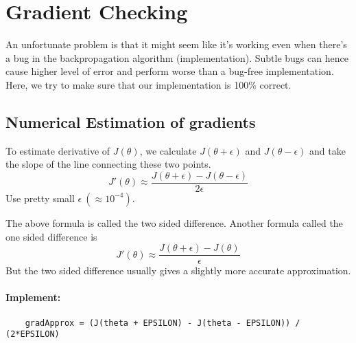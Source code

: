 \section{Gradient Checking}
An unfortunate problem is that it might seem like it's working even when there's a
bug in the backpropagation algorithm (implementation). Subtle bugs can hence cause
higher level of error and perform worse than a bug-free implementation. Here, we
try to make sure that our implementation is 100\% correct.

\subsection{Numerical Estimation of gradients}
To estimate derivative of $J(\theta)$, we calculate $J(\theta + \epsilon)$
and $J(\theta - \epsilon)$ and take the slope of the line connecting these two points.
\begin{equation*}
	J'(\theta) \approx \frac{J(\theta + \epsilon) - J(\theta - \epsilon)}{2\epsilon}
\end{equation*}
Use pretty small $\epsilon\ (\approx 10^{-4})$.

The above formula is called the
two sided difference. Another formula called the one sided difference is
\begin{equation*}
	J'(\theta) \approx \frac{J(\theta + \epsilon) - J(\theta)}{\epsilon}
\end{equation*}
But the two sided difference usually gives a slightly more accurate approximation.

\paragraph{Implement:}
\begin{verbatim}
	gradApprox = (J(theta + EPSILON) - J(theta - EPSILON)) / (2*EPSILON)
\end{verbatim}


